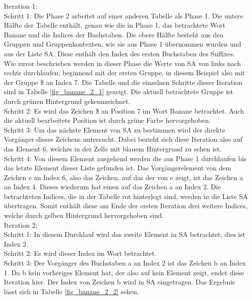 Iteration 1:\\
Schritt 1: Die Phase 2 arbeitet auf einer anderen Tabelle als Phase 1. 
Die untere Hälfte der Tabelle enthält, genau wie die in Phase 1, das betrachtete Wort Banane und die Indices der Buchstaben. 
Die obere Hälfte besteht aus den Gruppen und Gruppenkontexten, wie sie aus Phase 1 übernommen wurden und aus der Liste SA. 
Diese enthält den Index des ersten Buchstaben des Suffixes.
Wie zuvor beschrieben werden in dieser Phase die Werte von SA von links nach rechts durchlaufen, beginnend mit der ersten Gruppe, in diesem Beispiel also mit der Gruppe \$ an Index 7. 
Die Tabelle und die einzelnen Schritte dieser Iteration sind in Tabelle \ref{fig_banane_2_1} gezeigt. 
Die aktuell betrachtete Gruppe ist durch grünen Hintergrund gekennzeichnet. \\
Schritt 2: Es wird das Zeichen \$ an Position 7 im Wort Banane betrachtet. 
Auch die aktuell bearbeitete Position ist durch grüne Farbe hervorgehoben. \\
Schritt 3: Um das nächste Element von SA zu bestimmen wird der direkte Vorgänger dieses Zeichens untersucht. 
Dabei bezieht sich diese Iteration also auf das Element 6, welches in der Zelle mit blauem Hintergrund zu sehen ist. \\
Schritt 4: Von diesem Element ausgehend werden die \prevpointer aus Phase 1 durchlaufen bis das letzte Element dieser Liste gefunden ist. 
Das Vorgängerelement von dem Zeichen e an Index 6, also das Zeichen, auf das der \prevpointer von e zeigt, ist das Zeichen a an Index 4. 
Dieses wiederum hat einen \prevpointer auf das Zeichen a an Index 2. Die betrachteten Indices, die in der Tabelle rot hinterlegt sind, werden in die Liste SA übertragen. 
Somit enthält diese am Ende der ersten Iteration drei weitere Indices, welche durch gelben Hintergrund hervorgehoben sind. \\

Iteration 2:\\
Schritt 1: In diesem Durchlauf wird das zweite Element in SA betrachtet, dies ist Index 2.\\
Schritt 2: Es wird dieser Index im Wort betrachtet.\\
Schritt 3: Der Vorgänger des Buchstaben a an Index 2 ist das Zeichen b an Index 1. 
Da b kein vorheriges Element hat, der \prevpointer also auf kein Element zeigt, endet diese Iteration hier. 
Der Index von Zeichen b wird in SA eingetragen. Das Ergebnis lässt sich in Tabelle \ref{fig_banane_2_2} sehen.\\

